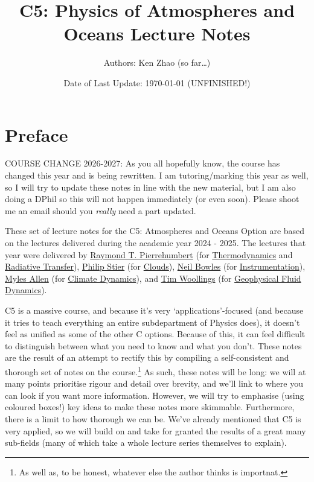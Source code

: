 \documentclass[a4paper,11pt,twoside]{report}
\title{C5: Physics of Atmospheres and Oceans Lecture Notes}
\author{Authors: Ken Zhao (so far\dots)}
\date{Date of Last Update: \today \hspace{2mm} (UNFINISHED!)}
\begin{document}
\begin{titlingpage}
\maketitle
\end{titlingpage}

\tableofcontents

\newpage

\begin{sloppypar}

\section*{Preface}

COURSE CHANGE 2026-2027: As you all hopefully know, the course has changed this year and is being rewritten. I am tutoring/marking this year as well, so I will try to update these notes in line with the new material, but I am also doing a DPhil so this will not happen immediately (or even soon). Please shoot me an email should you \textit{really} need a part updated.

These set of lecture notes for the C5: Atmospheres and Oceans Option are based on the lectures delivered during the academic year 2024 - 2025. The lectures that year were delivered by 
\href{https://users.physics.ox.ac.uk/~pierrehumbert/}{Raymond T. Pierrehumbert} 
(for \hyperref[p Thermodynamics]{Thermodynamics} and \hyperref[Radiative Transfer]{Radiative Transfer}), 
\href{https://www.physics.ox.ac.uk/our-people/stier}{Philip Stier} 
(for \hyperref[Clouds]{Clouds}), 
\href{https://www.physics.ox.ac.uk/our-people/bowles}{Neil Bowles} 
(for \hyperref[Instrumentation]{Instrumentation}), 
\href{https://www.physics.ox.ac.uk/our-people/allenm}{Myles Allen} 
(for \hyperlink{Climate Dynamics}{Climate Dynamics}), and \href{https://www.physics.ox.ac.uk/our-people/woollings}{Tim Woollings} 
(for \hyperref[Geophysical Fluid Dynamics]{Geophysical Fluid Dynamics}).

C5 is a massive course, and because it's very `applications'-focused (and because it tries to teach everything an entire subdepartment of Physics does), it doesn't feel as unified as some of the other C options. Because of this, it can feel difficult to distinguish between what you need to know and what you don't. These notes are the result of an attempt to rectify this by compiling a self-consistent and thorough set of notes on the course.\footnote{As well as, to be honest, whatever else the author thinks is importnat.} As such, these notes will be long: we will at many points prioritise rigour and detail over brevity, and we'll link to where you can look if you want more information. However, we will try to emphasise (using coloured boxes!) key ideas to make these notes more skimmable. Furthermore, there is a limit to how thorough we can be. We've already mentioned that C5 is very applied, so we will build on and take for granted the results of a great many sub-fields (many of which take a whole lecture series themselves to explain).


\end{sloppypar}
\end{document}
